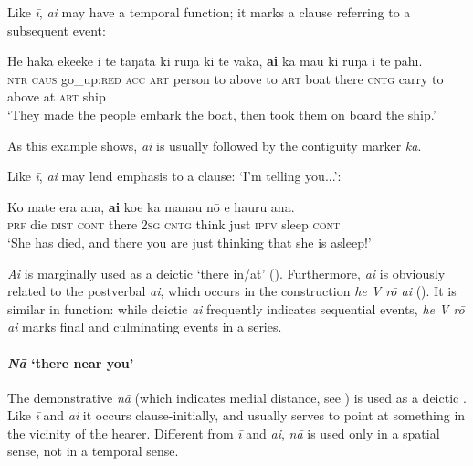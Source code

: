 Like \textit{{\ꞌ}ī}, \textit{{\ꞌ}ai} may have a temporal function; it marks a clause referring to a subsequent event:

\ea\label{ex:4.156}
\gll He haka ekeeke i te taŋata ki ruŋa ki te vaka, \textbf{{\ꞌ}ai} ka ma{\ꞌ}u  ki ruŋa i te pahī.\\
\textsc{ntr} \textsc{caus} go\_up:\textsc{red} \textsc{acc} \textsc{art} person to above to \textsc{art} boat there \textsc{cntg} carry  to above at \textsc{art} ship\\

\glt
‘They made the people embark the boat, then took them on board the ship.’ \textstyleExampleref{[R210.042]} 
\z

As this example shows, \textit{{\ꞌ}ai} is usually followed by the contiguity marker \textit{ka}.

Like \textit{{\ꞌ}ī}, \textit{{\ꞌ}ai} may lend emphasis to a clause: ‘I’m telling you...’:

\ea\label{ex:4.157}
\gll Ko mate era {\ꞌ}ana, \textbf{{\ꞌ}ai} koe ka mana{\ꞌ}u nō e ha{\ꞌ}uru {\ꞌ}ana.\\
\textsc{prf} die \textsc{dist} \textsc{cont} there \textsc{2sg} \textsc{cntg} think just \textsc{ipfv} sleep \textsc{cont}\\

\glt 
‘She has died, and there you are just thinking that she is asleep!’ \textstyleExampleref{[R229.303]} 
\z

\textit{{\ꞌ}Ai} is marginally used as a deictic  ‘there in/at’ (). Furthermore, \textit{{\ꞌ}ai} is obviously related to the postverbal  \textit{{\ꞌ}ai}, which occurs in the construction \textit{he V rō {\ꞌ}ai} (). It is similar in function: while deictic \textit{{\ꞌ}ai} frequently indicates sequential events, \textit{he V rō {\ꞌ}ai} marks final and culminating events in a series.
\paragraph{\textit{Nā} ‘there near you’}\label{sec:4.5.4.1.3}
The demonstrative \textit{nā} (which indicates medial distance, see ) is used as a deictic . Like \textit{{\ꞌ}ī} and \textit{{\ꞌ}ai} it occurs clause-initially, and usually serves to point at something in the vicinity of the hearer. Different from \textit{{\ꞌ}ī} and \textit{{\ꞌ}ai}, \textit{nā} is used only in a spatial sense, not in a temporal sense.

